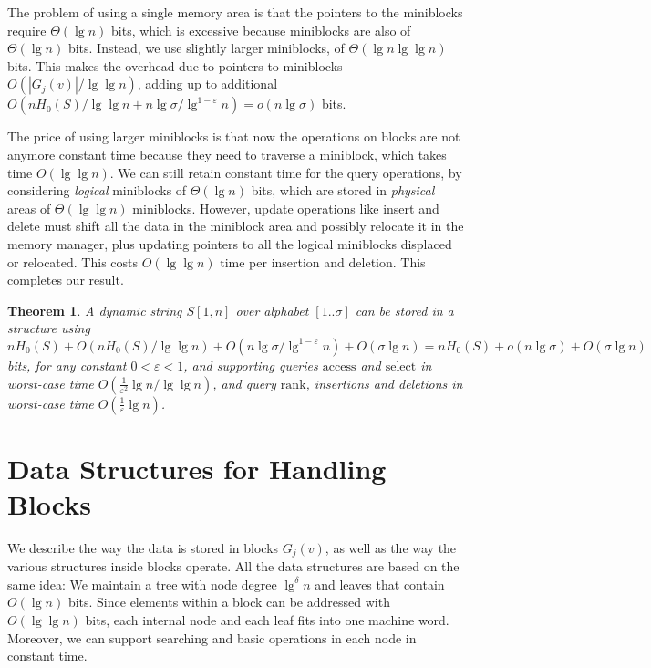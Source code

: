 \documentclass[11pt]{article}
\def\idrm#1{\ensuremath{\mathrm{#1}}}
\newcommand{\no}[1]{}
\newtheorem{theorem}{Theorem}
\newcommand{\ra}{\idrm{rank}}
\newcommand{\sel}{\idrm{select}}
\newcommand{\acc}{\idrm{access}}
\newcommand{\eps}{\varepsilon}
\begin{document}
The problem of using a single memory area is that the pointers to the
miniblocks require $\Theta(\lg n)$ bits, which is excessive because miniblocks
are also of $\Theta(\lg n)$ bits. Instead, we use slightly larger miniblocks,
of $\Theta(\lg n \lg\lg n)$ bits. This makes the overhead due to pointers
to miniblocks $O(|G_j(v)|/\lg\lg n)$, adding up to additional
$O(nH_0(S)/\lg\lg n + n\lg\sigma/\lg^{1-\eps} n)= o(n\lg\sigma)$ bits.

The price of using larger miniblocks is that now the operations on blocks
are not anymore constant time because they need to traverse a miniblock,
which takes time $O(\lg\lg n)$. We can still retain constant time for the
query operations, by considering {\em logical} miniblocks of $\Theta(\lg n)$
bits, which are stored in {\em physical} areas of $\Theta(\lg\lg n)$
miniblocks. However, update operations like insert and delete must shift 
all the data in the miniblock area and possibly relocate it in the memory 
manager, plus updating pointers to all the logical miniblocks displaced or 
relocated. This costs $O(\lg\lg n)$ time per insertion and deletion.
This completes our result.


\begin{theorem}
\label{thm:worstcase}
A dynamic string $S[1,n]$ over alphabet $[1..\sigma]$ 
can be stored in a structure using 
$nH_0(S) + O(nH_0(S)/\lg\lg n) + O(n\lg\sigma/\lg^{1-\eps} n)+O(\sigma \lg n)
= nH_0(S)+o(n\lg\sigma)+O(\sigma\lg n)$ bits, for any constant $0<\eps<1$,
and supporting queries $\acc$ and $\sel$ in worst-case time
$O(\frac{1}{\eps^2}\lg n /\lg\lg n)$, and query $\ra$, insertions and deletions in  worst-case time $O(\frac{1}{\eps}\lg n)$.
\end{theorem}

\no{
\section{Extensions}
\label{sec:ext}

\subsection{Handling General Alphabets}
\label{sec:alphabet}
}

\section{Data Structures for Handling Blocks} \label{app:A}

We describe the way the data is stored in blocks $G_j(v)$, as well as 
the way the various structures inside blocks operate. All the data 
structures are based on the same idea: We maintain a tree with node degree 
$\lg^{\delta}n$ and leaves that contain $O(\lg n)$ bits. Since elements 
within a block can be addressed with $O(\lg \lg n)$ bits, each internal node 
and each leaf fits into one machine word. Moreover, we can support searching 
and basic operations  in each node in constant time.  
\end{document}
